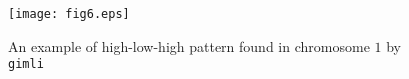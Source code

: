 \documentclass[12pt]{amsart}
\newcommand{\gimli}{\texttt{gimli}}
\begin{document}
\begin{figure}\label{fig6}
\texttt{[image: fig6.eps]}
\caption{An example of high-low-high pattern found in chromosome $1$ by \gimli{}}
\end{figure}








\end{document}
